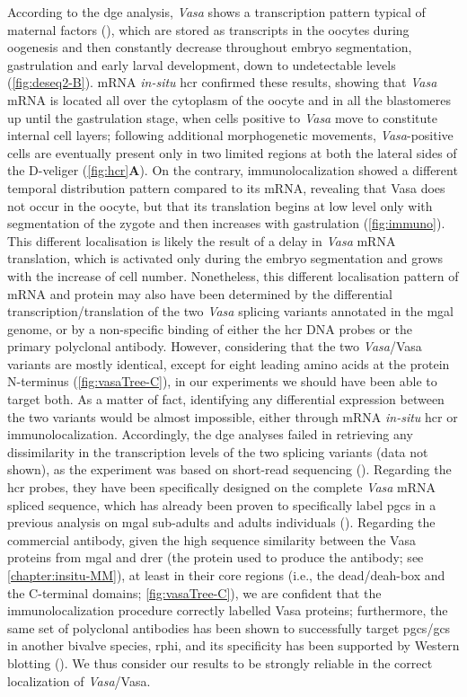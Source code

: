 According to the \gls{dge} analysis, \textit{Vasa} shows a transcription pattern typical of maternal factors (), which are stored as transcripts in the oocytes during oogenesis and then constantly decrease throughout embryo segmentation, gastrulation and early larval development, down to undetectable levels (\cref{fig:deseq2-B}). mRNA \textit{in-situ} \gls{hcr} confirmed these results, showing that \textit{Vasa} mRNA is located all over the cytoplasm of the oocyte and in all the blastomeres up until the gastrulation stage, when cells positive to \textit{Vasa} move to constitute internal cell layers; following additional morphogenetic movements, \textit{Vasa}-positive cells are eventually present only in two limited regions at both the lateral sides of the D-veliger (\cref{fig:hcr}\textbf{A}). On the contrary, immunolocalization showed a different temporal distribution pattern compared to its mRNA, revealing that Vasa does not occur in the oocyte, but that its translation begins at low level only with segmentation of the zygote and then increases with gastrulation (\cref{fig:immuno}). This different localisation is likely the result of a delay in \textit{Vasa} mRNA translation, which is activated only during the embryo segmentation and grows with the increase of cell number. Nonetheless, this different localisation pattern of mRNA and protein may also have been determined by the differential transcription/translation of the two \textit{Vasa} splicing variants annotated in the \gls{mgal} genome, or by a non-specific binding of either the \gls{hcr} DNA probes or the primary polyclonal antibody. However, considering that the two \textit{Vasa}/Vasa variants are mostly identical, except for eight leading amino acids at the protein N-terminus (\cref{fig:vasaTree-C}), in our experiments we should have been able to target both. As a matter of fact, identifying any differential expression between the two variants would be almost impossible, either through mRNA \textit{in-situ} \gls{hcr} or immunolocalization. Accordingly, the \gls{dge} analyses failed in retrieving any dissimilarity in the transcription levels of the two splicing variants (data not shown), as the experiment was based on short-read sequencing (). Regarding the \gls{hcr} probes, they have been specifically designed on the complete \textit{Vasa} mRNA spliced sequence, which has already been proven to specifically label \glspl{pgc} in a previous analysis on \gls{mgal} sub-adults and adults individuals (). Regarding the commercial antibody, given the high sequence similarity between the Vasa proteins from \gls{mgal} and \gls{drer} (the protein used to produce the antibody; see \cref{chapter:insitu-MM}), at least in their core regions (i.e., the \gls{dead/deah-box} and the C-terminal domains; \cref{fig:vasaTree-C}), we are confident that the immunolocalization procedure correctly labelled Vasa proteins; furthermore, the same set of polyclonal antibodies has been shown to successfully target \glspl{pgc}/\glspl{gc} in another bivalve species, \gls{rphi}, and its specificity has been supported by Western blotting (). We thus consider our results to be strongly reliable in the correct localization of \textit{Vasa}/Vasa.

